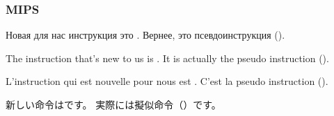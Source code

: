 ﻿\subsubsection{MIPS}

\ifdefined\RUSSIAN


Новая для нас инструкция это . Вернее, это псевдоинструкция ().
\fi

\ifdefined\ENGLISH


The instruction that's new to us is . It is actually the pseudo instruction ().
\fi

\ifdefined\FRENCH


L'instruction qui est nouvelle pour nous est . C'est la pseudo instruction ().
\fi

\ifdefined\JAPANESE


新しい命令はです。 実際には擬似命令（）です。
\fi

